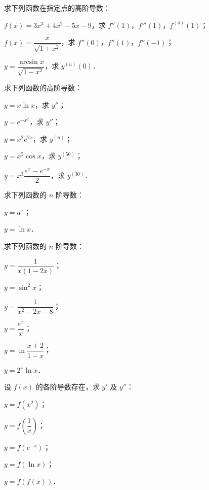 \begin{xiti}
\item 求下列函数在指定点的高阶导数：
\begin{ziti}
\item $f(x)=3x^{3}+4x^{2}-5x-9$，求 $f''(1)$，$f'''(1)$，$f^{(4)}(1)$；
\item $f(x)=\dfrac{x}{\sqrt{1+x^{2}}}$，求 $f''(0)$，$f''(1)$，$f''(-1)$；
\item $y=\dfrac{\arcsin x}{\sqrt{1-x^{2}}}$，求 $y^{(n)}(0)$．
\end{ziti}

\item 求下列函数的高阶导数：
\begin{ziti}
\item $y=x\ln x$，求 $y''$；
\item $y=e^{-x^{2}}$，求 $y''$；
\item $y=x^{2}e^{2x}$，求 $y^{(n)}$；
\item $y=x^{5}\cos x$，求 $y^{(50)}$；
\item $y=x^{3}\dfrac{e^{x}-e^{-x}}{2}$，求 $y^{(30)}$．
\end{ziti}

\item 求下列函数的 $n$ 阶导数：
\begin{ziti}
\item $y=a^{x}$；
\item $y=\ln x$．
\end{ziti}

\item 求下列函数的 $n$ 阶导数：
\begin{ziti}
\item $y=\dfrac{1}{x(1-2x)}$；
\item $y=\sin^{2}x$；
\item $y=\dfrac{1}{x^{2}-2x-8}$；
\item $y=\dfrac{e^{x}}{x}$；
\item $y=\ln\dfrac{x+2}{1-x}$；
\item $y=2^{x}\ln x$．
\end{ziti}

\item 设 $f(x)$ 的各阶导数存在，求 $y'$ 及 $y''$：
\begin{ziti}
\item $y=f(x^{2})$；
\item $y=f\left(\dfrac{1}{x}\right)$；
\item $y=f(e^{-x})$；
\item $y=f(\ln x)$；
\item $y=f(f(x))$．
\end{ziti}


\end{xiti}

